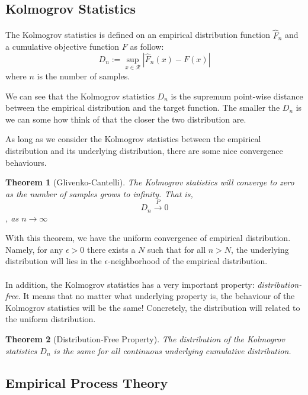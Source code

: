\documentclass[a4paper, 11pt]{article} %
\newtheorem{theorem}{Theorem}
\begin{document}
\subsection{Kolmogrov Statistics}
\paragraph{}
The Kolmogrov statistics is defined on an empirical distribution function $\hat{F}_n$ and a cumulative objective function $F$ as follow:
$$D_n:=\sup_{x\in\mathcal{R}}|\hat{F}_n(x)-F(x)|$$
where $n$ is the number of samples.

We can see that the Kolmogrov statistics $D_n$ is the supremum point-wise distance between the empirical distribution and the target function. The smaller the $D_n$ is we can some how think of that the closer the two distribution are.

As long as we consider the Kolmogrov statistics between the empirical distribution and its underlying distribution, there are some nice convergence behaviours.

\begin{theorem}[Glivenko-Cantelli]
The Kolmogrov statistics will converge to zero as the number of samples grows to infinity. That is,
$$D_n\xrightarrow{P}0$$, as $n\rightarrow\infty$
\end{theorem}

With this theorem, we have the uniform convergence of empirical distribution. Namely, for any $\epsilon > 0$ there exists a $N$ such that for all $n>N$, the underlying distribution will lies in the $\epsilon$-neighborhood of the empirical distribution.

\paragraph{}
In addition, the Kolmogrov statistics has a very important property: {\it distribution-free}. It means that no matter what underlying property is, the behaviour of the Kolmogrov statistics will be the same! Concretely, the distribution will related to the uniform distribution.

\begin{theorem}[Distribution-Free Property]
The distribution of the Kolmogrov statistics $D_n$ is the same for all continuous underlying cumulative distribution.
\end{theorem}

\subsection{Empirical Process Theory}
\end{document}
